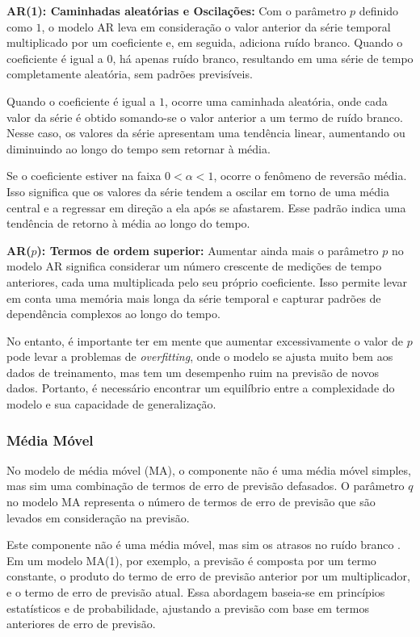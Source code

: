  \textbf{AR(1): Caminhadas aleat\'orias e Oscila\c c\~oes: }
 Com o parâmetro $p$ definido como $1$, o modelo AR leva em consideração o valor anterior da série temporal multiplicado por um coeficiente e, em seguida, adiciona ruído branco. Quando o coeficiente é igual a $0$, há apenas ruído branco, resultando em uma série de tempo completamente aleatória, sem padrões previsíveis.
 
 Quando o coeficiente é igual a $1$, ocorre uma caminhada aleatória, onde cada valor da série é obtido somando-se o valor anterior a um termo de ruído branco. Nesse caso, os valores da série apresentam uma tendência linear, aumentando ou diminuindo ao longo do tempo sem retornar à média.
 
 Se o coeficiente estiver na faixa $0 < \alpha < 1$, ocorre o fenômeno de reversão média. Isso significa que os valores da série tendem a oscilar em torno de uma média central e a regressar em direção a ela após se afastarem. Esse padrão indica uma tendência de retorno à média ao longo do tempo.
 
 
 \textbf{AR($p$): Termos de ordem superior: }
 Aumentar ainda mais o parâmetro $p$ no modelo AR significa considerar um número crescente de medições de tempo anteriores, cada uma multiplicada pelo seu próprio coeficiente. Isso permite levar em conta uma memória mais longa da série temporal e capturar padrões de dependência complexos ao longo do tempo.
 
 No entanto, é importante ter em mente que aumentar excessivamente o valor de $p$ pode levar a problemas de \textit{overfitting}, onde o modelo se ajusta muito bem aos dados de treinamento, mas tem um desempenho ruim na previsão de novos dados. Portanto, é necessário encontrar um equilíbrio entre a complexidade do modelo e sua capacidade de generalização.
 

 
 \subsubsection{M\'edia M\'ovel}\label{subsubsec:ma}
 No modelo de média móvel (MA), o componente não é uma média móvel simples, mas sim uma combinação de termos de erro de previsão defasados. O parâmetro $q$ no modelo MA representa o número de termos de erro de previsão que são levados em consideração na previsão.
 
 Este componente não é uma média móvel, mas sim os atrasos no ruído branco \cite{signal}.
 Em um modelo MA(1), por exemplo, a previsão é composta por um termo constante, o produto do termo de erro de previsão anterior por um multiplicador, e o termo de erro de previsão atual. Essa abordagem baseia-se em princípios estatísticos e de probabilidade, ajustando a previsão com base em termos anteriores de erro de previsão.
 
